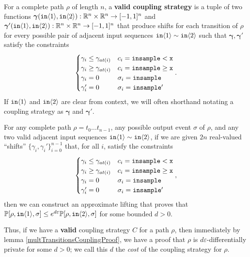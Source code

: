 \begin{defn}
  For a complete path $\rho$ of length $n$, a \textbf{valid coupling strategy} is a tuple of two functions $\bm{\gamma}(\texttt{in}\brangle{1}, \texttt{in}\brangle{2}):\RR^n\times \RR^n\to [-1, 1]^n$ and $\bm{\gamma}'(\texttt{in}\brangle{1}, \texttt{in}\brangle{2}):\RR^n\times \RR^n\to [-1, 1]^n$ 
  that produce shifts for each transition of $\rho$ for every possible pair of adjacent input sequences $\texttt{in}\brangle{1}\sim\texttt{in}\brangle{2}$ such that $\bm{\gamma}, \bm{\gamma'}$ satisfy the constraints \[
    \begin{cases}
      \gamma_i\leq\gamma_{at(i)} & c_i = \lguard[\texttt{x}]\\
      \gamma_i\geq\gamma_{at(i)} & c_i = \gguard[\texttt{x}]\\
      \gamma_i=0 & \sigma_i = \texttt{insample}\\
      \gamma_i'=0 & \sigma_i = \texttt{insample}'
    \end{cases}.
  \]
  If $\texttt{in}\brangle{1}$ and $\texttt{in}\brangle{2}$ are clear from context, we will often shorthand notating a coupling strategy as $\bm{\gamma}$ and $\bm{\gamma}'$. 
\end{defn}


\begin{lemma}\label{simplifiedMultTransitionsCouplingProof}
  For any complete path $\rho = t_0\ldots t_{n-1}$, any possible output event $\sigma$ of $\rho$, and any two valid adjacent input sequences $\texttt{in}\brangle{1}\sim \texttt{in}\brangle{2}$, if we are given $2n$ real-valued ``shifts'' $\{\gamma_i, \gamma_i'\}_{i=0}^{n-1}$ that, for all $i$, satisfy the constraints \[
        \begin{cases}
          \gamma_i\leq\gamma_{at(i)} & c_i = \lguard[\texttt{x}]\\
          \gamma_i\geq\gamma_{at(i)} & c_i = \gguard[\texttt{x}]\\
          \gamma_i=0 & \sigma_i = \texttt{insample}\\
          \gamma_i'=0 & \sigma_i = \texttt{insample}'
        \end{cases},
      \]
      then we can construct an approximate lifting that proves that $\PP[\rho, \texttt{in}\brangle{1}, \sigma] \leq e^{d\varepsilon}\PP[\rho, \texttt{in}\brangle{2}, \sigma]$ for some bounded $d>0$. 
\end{lemma}


Thus, if we have a \textbf{valid} coupling strategy $C$ for a path $\rho$, then immediately by lemma \ref{multTransitionsCouplingProof}, we have a proof that $\rho$ is $d\varepsilon$-differentially private for some $d>0$; we call this $d$ the \textit{cost} of the coupling strategy for $\rho$. 

